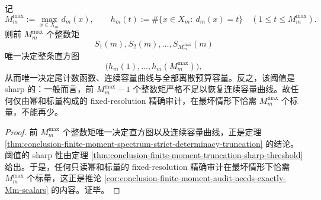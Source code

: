 \begin{theorem}\label{thm:conclusion-fixedscale-power-sum-sharp-threshold-maxfiber}
记
\[
M_m^{\max}:=\max_{x\in X_m}d_m(x),
\qquad
h_m(t):=\#\{x\in X_m:\ d_m(x)=t\}
\quad(1\le t\le M_m^{\max}).
\]
则前 \(M_m^{\max}\) 个整数矩
\[
S_1(m),S_2(m),\dots,S_{M_m^{\max}}(m)
\]
唯一决定整条直方图
\[
\bigl(h_m(1),\dots,h_m(M_m^{\max})\bigr),
\]
从而唯一决定尾计数函数、连续容量曲线与全部离散预算容量。反之，该阈值是 sharp 的：一般而言，前 \(M_m^{\max}-1\) 个整数矩严格不足以恢复连续容量曲线。故任何仅由幂和标量构成的 fixed-resolution 精确审计，在最坏情形下恰需 \(M_m^{\max}\) 个标量，不能再少。
\end{theorem}
\begin{proof}
前 \(M_m^{\max}\) 个整数矩唯一决定直方图以及连续容量曲线，正是定理 \ref{thm:conclusion-finite-moment-spectrum-strict-determinacy-truncation} 的结论。阈值的 sharp 性由定理 \ref{thm:conclusion-finite-moment-truncation-sharp-threshold} 给出。于是，任何只读幂和标量的 fixed-resolution 精确审计在最坏情形下恰需 \(M_m^{\max}\) 个标量，这正是推论 \ref{cor:conclusion-finite-moment-audit-needs-exactly-Mm-scalars} 的内容。证毕。
\end{proof}

